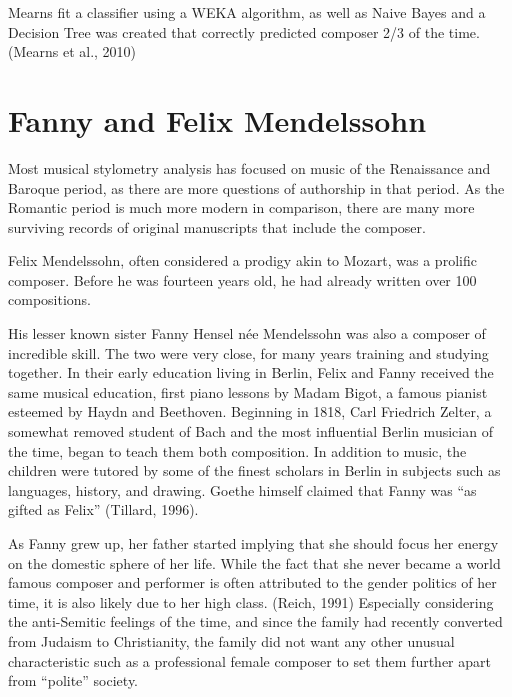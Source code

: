 \documentclass[12pt,twoside]{reedthesis}
\theoremstyle{definition}
\theoremstyle{definition}
\theoremstyle{definition}
\theoremstyle{remark}
\begin{document}
Mearns fit a classifier using a WEKA algorithm, as well as Naive Bayes
and a Decision Tree was created that correctly predicted composer 2/3 of
the time. (Mearns et al., 2010)

\section{Fanny and Felix Mendelssohn}\label{fanny-and-felix-mendelssohn}

Most musical stylometry analysis has focused on music of the Renaissance
and Baroque period, as there are more questions of authorship in that
period. As the Romantic period is much more modern in comparison, there
are many more surviving records of original manuscripts that include the
composer.

Felix Mendelssohn, often considered a prodigy akin to Mozart, was a
prolific composer. Before he was fourteen years old, he had already
written over 100 compositions.

His lesser known sister Fanny Hensel née Mendelssohn was also a composer
of incredible skill. The two were very close, for many years training
and studying together. In their early education living in Berlin, Felix
and Fanny received the same musical education, first piano lessons by
Madam Bigot, a famous pianist esteemed by Haydn and Beethoven. Beginning
in 1818, Carl Friedrich Zelter, a somewhat removed student of Bach and
the most influential Berlin musician of the time, began to teach them
both composition. In addition to music, the children were tutored by
some of the finest scholars in Berlin in subjects such as languages,
history, and drawing. Goethe himself claimed that Fanny was ``as gifted
as Felix'' (Tillard, 1996).

As Fanny grew up, her father started implying that she should focus her
energy on the domestic sphere of her life. While the fact that she never
became a world famous composer and performer is often attributed to the
gender politics of her time, it is also likely due to her high class.
(Reich, 1991) Especially considering the anti-Semitic feelings of the
time, and since the family had recently converted from Judaism to
Christianity, the family did not want any other unusual characteristic
such as a professional female composer to set them further apart from
``polite'' society.
\end{document}
